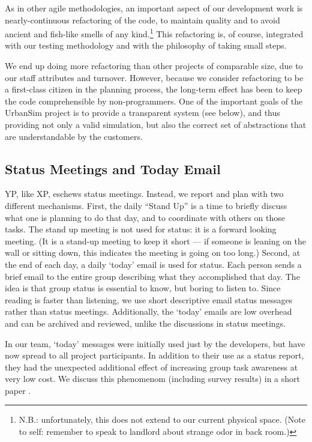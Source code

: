 \documentclass[times, 10pt,twocolumn]{article}
\begin{document}
As in other agile methodologies, an important aspect of our development
work is nearly-continuous refactoring of the code, to maintain quality and
to avoid ancient and fish-like smells of any kind.\footnote{N.B.:
unfortunately, this does not extend to our current physical space.  (Note
to self: remember to speak to landlord about strange odor in back room.)}
This refactoring is, of course, integrated with our testing methodology and
with the philosophy of taking small steps.

We end up doing more refactoring than other projects of comparable size,
due to our staff attributes and turnover.  However, because we consider
refactoring to be a first-class citizen in the planning process, the
long-term effect has been to keep the code comprehensible by non-programmers.
One of the important goals of the UrbanSim project is to provide a 
transparent system (see below), and thus providing not only a 
valid simulation, but also the correct set of abstractions that
are understandable by the customers.

\subsection{Status Meetings and Today Email}

YP, like XP, eschews status meetings.  Instead, we report and plan
with two different mechanisms.  First, the daily ``Stand Up'' is a time to
briefly discuss what one is planning to do that day, and to coordinate with
others on those tasks.  The stand up meeting is not used for status: it is
a forward looking meeting.  (It is a stand-up meeting to keep it short ---
if someone is leaning on the wall or sitting down, this indicates the
meeting is going on too long.)  Second,
at the end of each day, a daily `today' email is used for status.
Each person sends a brief email to the entire group describing what they
accomplished that day.  The idea is that group status is essential to know,
but boring to listen to.  Since reading is faster than
listening, we use short descriptive email status messages rather than
status meetings.  Additionally, the `today' emails are low overhead and can
be archived and reviewed, unlike the discussions in status meetings.  

In our team, `today' messages were initially used just by the developers,
but have now spread to all project participants.  In addition to their use
as a status report, they had the unexpected additional effect of increasing
group task awareness at very low cost.  We discuss this phenomenom
(including survey results) in a short paper \cite{brush-today-msgs-2002}.
\end{document}
